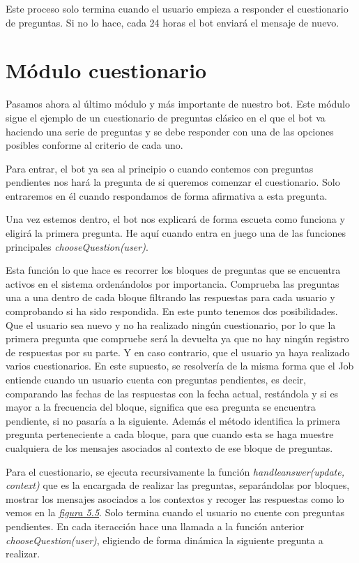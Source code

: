 Este proceso solo termina cuando el usuario empieza a responder el cuestionario de preguntas. Si no lo hace, cada 24 horas el bot enviará el mensaje de nuevo. 

\section{Módulo cuestionario}


Pasamos ahora al último módulo y más importante de nuestro bot. Este módulo sigue el ejemplo de un cuestionario de preguntas clásico en el que el bot va haciendo una serie de preguntas y se debe responder con una de las opciones posibles conforme al criterio de cada uno. 

Para entrar, el bot ya sea al principio o cuando contemos con preguntas pendientes nos hará la pregunta de si queremos comenzar el cuestionario. Solo entraremos en él cuando respondamos de forma afirmativa a esta pregunta. 

Una vez estemos dentro, el bot nos explicará de forma escueta como funciona y eligirá la primera pregunta. He aquí cuando entra en juego una de las funciones principales \textit{chooseQuestion(user)}.

Esta función lo que hace es recorrer los bloques de preguntas que se encuentra activos en el sistema ordenándolos por importancia. Comprueba las preguntas una a una dentro de cada bloque filtrando las respuestas para cada usuario y comprobando si ha sido respondida. En este punto tenemos dos posibilidades. Que el usuario sea nuevo y no ha realizado ningún cuestionario, por lo que la primera pregunta que compruebe será la devuelta ya que no hay ningún registro de respuestas por su parte. Y en caso contrario, que el usuario ya haya realizado varios cuestionarios. En este supuesto, se resolvería de la misma forma que el Job entiende cuando un usuario cuenta con preguntas pendientes, es decir, comparando las fechas de las respuestas con la fecha actual, restándola y si es mayor a la frecuencia del bloque, significa que esa pregunta se encuentra pendiente, si no pasaría a la siguiente. Además el método identifica la primera pregunta perteneciente a cada bloque, para que cuando esta se haga muestre cualquiera de los mensajes asociados al contexto de ese bloque de preguntas.

Para el cuestionario, se ejecuta recursivamente la función \textit{handleanswer(update, context)} que es la encargada de realizar las preguntas, separándolas por bloques, mostrar los mensajes asociados a los contextos y recoger las respuestas como lo vemos en la \textit{\hyperref[fig:cuestionario]{figura 5.5}}. Solo termina cuando el usuario no cuente con preguntas pendientes. En cada iteracción hace una llamada a la función anterior \textit{chooseQuestion(user)}, eligiendo de forma dinámica la siguiente pregunta a realizar. 

